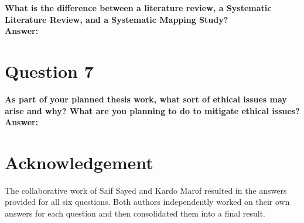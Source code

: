 \documentclass[conference]{IEEEtran}
\begin{document}
\textbf{What is the difference between a literature review, a Systematic Literature Review, and a Systematic Mapping Study?}\\

\textbf{Answer:}

\section{Question 7}

\textbf{As part of your planned thesis work, what sort of ethical issues may arise and why? What are you planning to do to mitigate ethical issues?}\\

\textbf{Answer:} 

\section{Acknowledgement}
The collaborative work of Saif Sayed and Kardo Marof resulted in the answers provided for all six questions. Both authors independently worked on their own answers for each question and then consolidated them into a final result.
\end{document}

